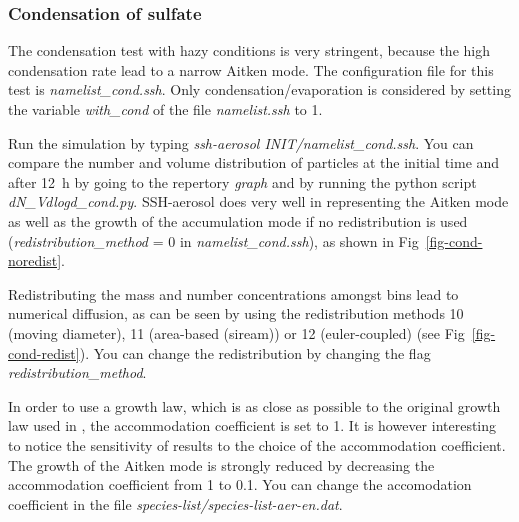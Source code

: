 \documentclass[a4paper,11pt]{article}
\begin{document}
\subsubsection{Condensation of sulfate}
\label{cond-sulf}

The condensation test with hazy conditions is very stringent, because the high condensation
rate lead to a narrow Aitken mode.
The configuration file for this test is {\it{namelist\_cond.ssh}}.
Only condensation/evaporation is considered by setting the variable {\it{with\_cond}} of the file {\it{namelist.ssh}} to 1.

Run the simulation by typing {\it{ssh-aerosol INIT/namelist\_cond.ssh}}.
You can compare the number and volume distribution of particles at the initial
time and after 12~h by going to the repertory {\it{graph}} and by running the
python script {\it{dN\_Vdlogd\_cond.py}}.
SSH-aerosol does very well in representing
the Aitken mode as well as the growth of the accumulation mode if no
redistribution is used ({\it{redistribution\_method}} = 0 in
{\it{namelist\_cond.ssh}}), as shown in Fig~\ref{fig-cond-noredist}. 

Redistributing the mass and number concentrations
amongst bins lead to numerical diffusion, as can be seen by using the
redistribution methods 10 (moving diameter), 11 (area-based (siream)) or 12
(euler-coupled) (see Fig~\ref{fig-cond-redist}).
You can change the redistribution by changing the flag {\it{redistribution\_method}}.

In order to use a growth law, which is as close as possible to the original growth law
used in \cite{zhang1999simulation} , the accommodation coefficient is set to 1. It is however interesting
to notice the sensitivity of results to the choice of the accommodation coefficient. 
The growth of the Aitken mode is strongly reduced by decreasing the
accommodation coefficient from 1 to 0.1.
You can change the accomodation coefficient in the file {\it{species-list/species-list-aer-en.dat}}.
\end{document}
